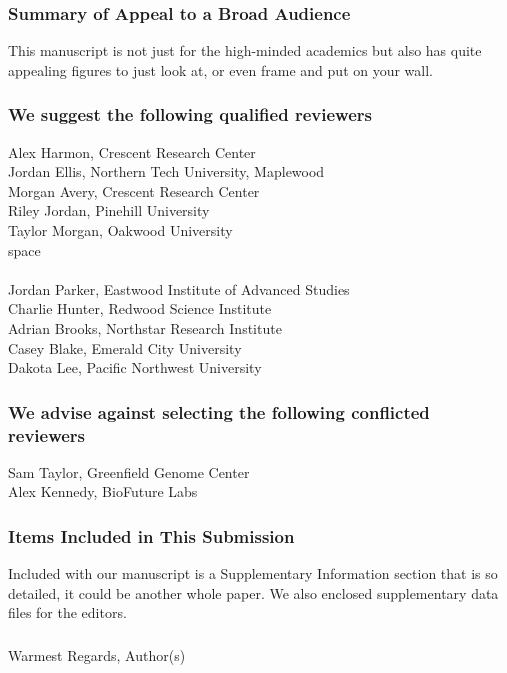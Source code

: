 \documentclass[11pt]{article}
\begin{document}
\subsubsection*{Summary of Appeal to a Broad Audience}
\noindent This manuscript is not just for the high-minded academics but also has quite appealing figures to just look at, or even frame and put on your wall.
\subsubsection*{We suggest the following qualified reviewers} %
\begin{multicols}{2}

\noindent Alex Harmon, Crescent Research Center\\
Jordan Ellis, Northern Tech University, Maplewood\\
Morgan Avery, Crescent Research Center\\
Riley Jordan, Pinehill University\\ 
Taylor Morgan, Oakwood University\\
{\color{white} space \\}\\
Jordan Parker, Eastwood Institute of Advanced Studies\\ 
Charlie Hunter, Redwood Science Institute\\ Adrian Brooks, Northstar Research Institute\\
Casey Blake, Emerald City University\\
Dakota Lee, Pacific Northwest University\\
\end{multicols}
\vspace{-0.75cm}
\subsubsection*{We advise against selecting the following conflicted reviewers} %
\noindent Sam Taylor, Greenfield Genome Center\\
Alex Kennedy, BioFuture Labs

\subsubsection{Items Included in This Submission}
\noindent Included with our manuscript is a Supplementary Information section that is so detailed, it could be another whole paper. We also enclosed supplementary data files for the editors. 

%
\subsubsection{}
Warmest Regards, %
\newline
Author(s)
\end{document}
